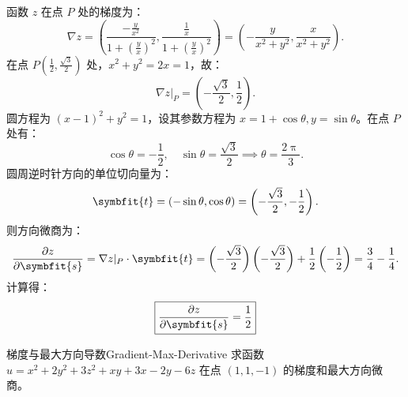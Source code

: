 \begin{solution}
    函数 $z$ 在点 $P$ 处的梯度为：
    \begin{equation}
        \nabla z = \left( \frac{-\frac{y}{x^2}}{1+(\frac{y}{x})^2}, \frac{\frac{1}{x}}{1+(\frac{y}{x})^2} \right) = \left( -\frac{y}{x^2+y^2}, \frac{x}{x^2+y^2} \right).
    \end{equation}
    在点 $P\left(\frac{1}{2}, \frac{\sqrt{3}}{2}\right)$ 处，$x^2+y^2 = 2x = 1$，故：
    \begin{equation}
        \nabla z|_{P} = \left( -\frac{\sqrt{3}}{2}, \frac{1}{2} \right).
    \end{equation}
    圆方程为 $(x-1)^2 + y^2 = 1$，设其参数方程为 $x = 1 + \cos \theta, y = \sin \theta$。在点 $P$ 处有：
    \begin{equation}
        \cos \theta = -\frac{1}{2}, \quad \sin \theta = \frac{\sqrt{3}}{2} \implies \theta = \frac{2\uppi}{3}.
    \end{equation}
    圆周逆时针方向的单位切向量为：
    \begin{equation}
        \symbfit{t} = (-\sin \theta, \cos \theta) = \left( -\frac{\sqrt{3}}{2}, -\frac{1}{2} \right).
    \end{equation}
    则方向微商为：
    \begin{equation}
        \frac{\partial z}{\partial \symbfit{s}} = \nabla z|_{P} \cdot \symbfit{t} = \left( -\frac{\sqrt{3}}{2} \right) \left( -\frac{\sqrt{3}}{2} \right) + \frac{1}{2} \left( -\frac{1}{2} \right) = \frac{3}{4} - \frac{1}{4}.
    \end{equation}
    计算得：
    \begin{equation}
        \boxed{\frac{\partial z}{\partial \symbfit{s}} = \frac{1}{2}}
    \end{equation}
\end{solution}


\begin{problem}{梯度与最大方向导数}{Gradient-Max-Derivative}
    求函数 $u = x^2 + 2y^2 + 3z^2 + xy + 3x - 2y - 6z$ 在点 $(1, 1, -1)$ 的梯度和最大方向微商。
\end{problem}

